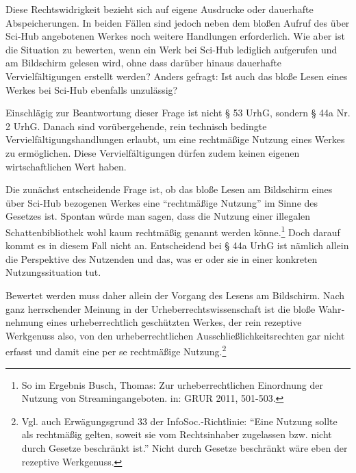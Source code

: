 \documentclass[a4paper,
fontsize=11pt,
oneside,
numbers=noperiodatend,
parskip=half-,
bibliography=totoc,
final
]{scrartcl}
\begin{document}
Diese Rechtswidrigkeit bezieht sich auf eigene Ausdrucke oder dauerhafte
Abspeicherungen. In beiden Fällen sind jedoch neben dem bloßen Aufruf
des über Sci-Hub angebotenen Werkes noch weitere Handlungen
erforderlich. Wie aber ist die Situation zu bewerten, wenn ein Werk bei
Sci-Hub lediglich aufgerufen und am Bild­schirm gelesen wird, ohne dass
darüber hinaus dauerhafte Vervielfältigungen erstellt werden? Anders
gefragt: Ist auch das bloße Lesen eines Werkes bei Sci-Hub ebenfalls
unzulässig?

Einschlägig zur Beantwortung dieser Frage ist nicht § 53 UrhG, sondern §
44a Nr. 2 UrhG. Danach sind vorübergehende, rein technisch bedingte
Vervielfältigungshand­lungen erlaubt, um eine rechtmäßige Nutzung eines
Werkes zu ermöglichen. Diese Vervielfältigungen dürfen zudem keinen
eigenen wirtschaftlichen Wert haben.

Die zunächst entscheidende Frage ist, ob das bloße Lesen am Bildschirm
eines über Sci-Hub bezogenen Werkes eine \enquote{rechtmäßige Nutzung}
im Sinne des Gesetzes ist. Spontan würde man sagen, dass die Nutzung
einer illegalen Schattenbibliothek wohl kaum rechtmäßig genannt werden
könne.\footnote{So im Ergebnis Busch, Thomas: Zur urheberrechtlichen
  Einordnung der Nutzung von Streamingangeboten. in: GRUR 2011, 501-503.}
Doch darauf kommt es in diesem Fall nicht an. Entscheidend bei § 44a
UrhG ist nämlich allein die Perspektive des Nutzen­den und das, was er
oder sie in einer konkreten Nutzungssituation tut.

Bewertet werden muss daher allein der Vorgang des Lesens am Bildschirm.
Nach ganz herrschender Meinung in der Urheberrechtswissenschaft ist die
bloße Wahr­nehmung eines urheberrechtlich geschützten Werkes, der rein
rezeptive Werkgenuss also, von den urheberrechtlichen
Ausschließlichkeitsrechten gar nicht erfasst und damit eine per se
rechtmäßige Nutzung.\footnote{Vgl. auch Erwägungsgrund 33 der
  InfoSoc.-Richtlinie: \enquote{Eine Nutzung sollte als rechtmäßig
  gelten, soweit sie vom Rechtsinhaber zugelassen bzw. nicht durch
  Gesetze beschränkt ist.} Nicht durch Gesetze beschränkt wäre eben der
  rezeptive Werkgenuss.}
\end{document}
